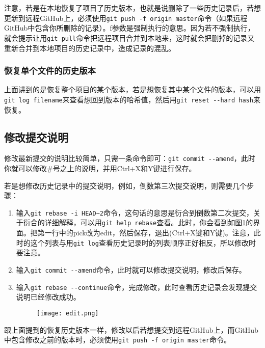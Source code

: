 \documentclass[a4paper,12pt]{article}
\begin{document}
注意，若是在本地恢复了项目了历史版本，也就是说删除了一些历史记录后，若想更新到远程GitHub上，必须使用\lstinline|git push -f origin master|命令（如果远程GitHub中包含你所删除的记录）。f参数是强制执行的意思。因为若不强制执行，就会提示让用\lstinline|git pull|命令把远程项目合并到本地来，这时就会把删掉的记录又重新合并到本地项目的历史记录中，造成记录的混乱。

\subsubsection{恢复单个文件的历史版本}

上面讲到的是恢复整个项目的某个版本，若是想恢复其中某个文件的版本，可以用\lstinline|git log filename|来查看想回到版本的哈希值，然后用\lstinline|git reset --hard hash|来恢复。

\subsection{修改提交说明}

修改最新提交的说明比较简单，只需一条命令即可：\lstinline|git commit --amend|，此时你就可以修改\#号之上的说明，并用Ctrl+X和Y键进行保存。 

若是想修改历史记录中的提交说明，例如，倒数第三次提交说明，则需要几个步骤：
\begin{enumerate}
\item 输入\lstinline|git rebase -i HEAD~2|命令，这句话的意思是衍合到倒数第二次提交，关于衍合的详细解释，可以用\lstinline|git help rebase|查看。此时，你会看到如图\ref{fig:10}的界面。把第一行中的pick改为edit，然后保存，退出(Ctrl+X键和Y键)。注意，此时的这个列表与用\lstinline|git log|查看历史记录时的列表顺序正好相反，所以修改时要注意。
\item 输入\lstinline|git commit --amend|命令，此时就可以修改提交说明，修改后保存。
\item 输入\lstinline|git rebase --continue|命令，完成修改，此时查看历史记录会发现提交说明已经修改成功。

\begin{figure}[!htb] %
\centering
\texttt{[image: edit.png]}
\caption{}\label{fig:10}
\end{figure}
\end{enumerate}

跟上面提到的恢复历史版本一样，修改以后若想提交到远程GitHub上，而GitHub中包含修改之前的版本时，必须使用\lstinline|git push -f origin master|命令。
\end{document}
